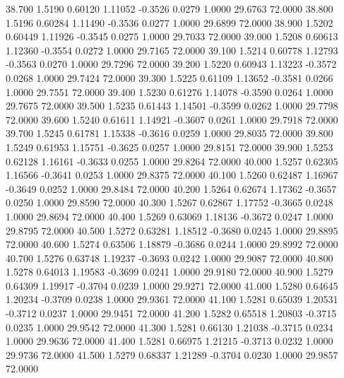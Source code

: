   38.700   1.5190   0.60120   1.11052  -0.3526   0.0279   1.0000  29.6763  72.0000
  38.800   1.5196   0.60284   1.11490  -0.3536   0.0277   1.0000  29.6899  72.0000
  38.900   1.5202   0.60449   1.11926  -0.3545   0.0275   1.0000  29.7033  72.0000
  39.000   1.5208   0.60613   1.12360  -0.3554   0.0272   1.0000  29.7165  72.0000
  39.100   1.5214   0.60778   1.12793  -0.3563   0.0270   1.0000  29.7296  72.0000
  39.200   1.5220   0.60943   1.13223  -0.3572   0.0268   1.0000  29.7424  72.0000
  39.300   1.5225   0.61109   1.13652  -0.3581   0.0266   1.0000  29.7551  72.0000
  39.400   1.5230   0.61276   1.14078  -0.3590   0.0264   1.0000  29.7675  72.0000
  39.500   1.5235   0.61443   1.14501  -0.3599   0.0262   1.0000  29.7798  72.0000
  39.600   1.5240   0.61611   1.14921  -0.3607   0.0261   1.0000  29.7918  72.0000
  39.700   1.5245   0.61781   1.15338  -0.3616   0.0259   1.0000  29.8035  72.0000
  39.800   1.5249   0.61953   1.15751  -0.3625   0.0257   1.0000  29.8151  72.0000
  39.900   1.5253   0.62128   1.16161  -0.3633   0.0255   1.0000  29.8264  72.0000
  40.000   1.5257   0.62305   1.16566  -0.3641   0.0253   1.0000  29.8375  72.0000
  40.100   1.5260   0.62487   1.16967  -0.3649   0.0252   1.0000  29.8484  72.0000
  40.200   1.5264   0.62674   1.17362  -0.3657   0.0250   1.0000  29.8590  72.0000
  40.300   1.5267   0.62867   1.17752  -0.3665   0.0248   1.0000  29.8694  72.0000
  40.400   1.5269   0.63069   1.18136  -0.3672   0.0247   1.0000  29.8795  72.0000
  40.500   1.5272   0.63281   1.18512  -0.3680   0.0245   1.0000  29.8895  72.0000
  40.600   1.5274   0.63506   1.18879  -0.3686   0.0244   1.0000  29.8992  72.0000
  40.700   1.5276   0.63748   1.19237  -0.3693   0.0242   1.0000  29.9087  72.0000
  40.800   1.5278   0.64013   1.19583  -0.3699   0.0241   1.0000  29.9180  72.0000
  40.900   1.5279   0.64309   1.19917  -0.3704   0.0239   1.0000  29.9271  72.0000
  41.000   1.5280   0.64645   1.20234  -0.3709   0.0238   1.0000  29.9361  72.0000
  41.100   1.5281   0.65039   1.20531  -0.3712   0.0237   1.0000  29.9451  72.0000
  41.200   1.5282   0.65518   1.20803  -0.3715   0.0235   1.0000  29.9542  72.0000
  41.300   1.5281   0.66130   1.21038  -0.3715   0.0234   1.0000  29.9636  72.0000
  41.400   1.5281   0.66975   1.21215  -0.3713   0.0232   1.0000  29.9736  72.0000
  41.500   1.5279   0.68337   1.21289  -0.3704   0.0230   1.0000  29.9857  72.0000

